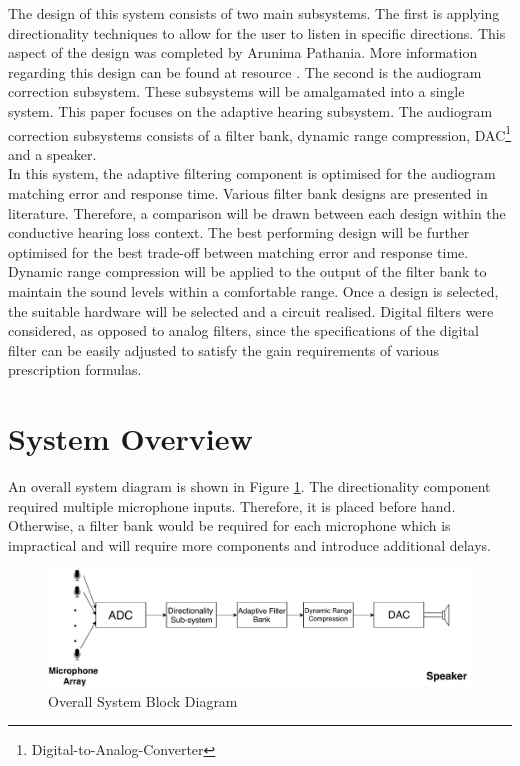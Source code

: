 \documentclass[11pt,onecolumn]{witseiepaper}
\begin{document}
\noindent The design of this system consists of two main subsystems. The first is applying directionality techniques to allow for the user to listen in specific directions. This aspect of the design was completed by Arunima Pathania. More information regarding this design can be found at resource \cite{aru}. The second is the audiogram correction subsystem. These subsystems will be amalgamated into a single system. This paper focuses on the adaptive hearing subsystem. The audiogram correction subsystems consists of a filter bank, dynamic range compression, DAC\footnote{Digital-to-Analog-Converter} and a speaker. \\
\newline
\noindent In this system, the adaptive filtering component is optimised for the audiogram matching error and response time. Various filter bank designs are presented in literature. Therefore, a comparison will be drawn between each design within the conductive hearing loss context. The best performing design will be further optimised for the best trade-off between matching error and response time. Dynamic range compression will be applied to the output of the filter bank to maintain the sound levels within a comfortable range. Once a design is selected, the suitable hardware will be selected and a circuit realised. Digital filters were considered, as opposed to analog filters, since the specifications of the digital filter can be easily adjusted to satisfy the gain requirements of various prescription formulas.


\section{System Overview}

\noindent An overall system diagram is shown in Figure \ref{fig:system}. The directionality component required multiple microphone inputs. Therefore, it is placed before hand. Otherwise, a filter bank would be required for each microphone which is impractical and will require more components and introduce additional delays.

\begin{figure}[h]
\centering
\includegraphics[width=0.9\linewidth]{system.pdf}
\caption{Overall System Block Diagram}
\label{fig:system}
\end{figure}  
\end{document}
